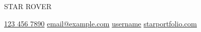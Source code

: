 \documentclass[11pt]{article}
\begin{document}

\begin{center}
  {
    \fontsize{36}{12}
    \selectfont
    \color{accent} 
    STAR ROVER %
  } \\ \medskip


  \href{tel:1234567890}{{\color{gray}{\faPhone}} 123 456 7890} \quad
  \href{mailto:youremail@example.com}{{\color{gray}{\faEnvelope}} email@example.com} \quad 
  \href{https://github.com/yourusername}{{\color{gray}{\faGithub}} username} \quad
  \href{https://github.com/}{{\color{gray}{\faLink}} starportfolio.com} 
\end{center}





  

\end{document}
